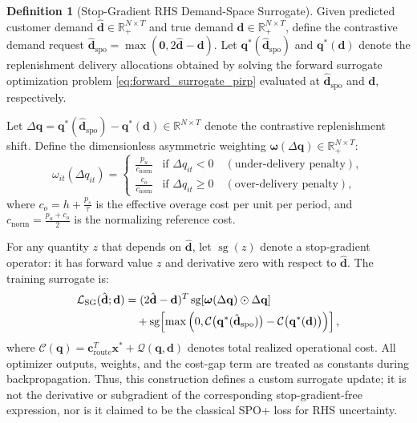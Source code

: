 \documentclass[11pt,a4paper]{article}
\theoremstyle{definition}
\newtheorem{definition}{Definition}
\theoremstyle{remark}
\begin{document}
\begin{definition}[Stop-Gradient RHS Demand-Space Surrogate]
\label{def:rhs_spop}
Given predicted customer demand $\hat{\mathbf{d}} \in \mathbb{R}_+^{N \times T}$ and true demand $\mathbf{d} \in \mathbb{R}_+^{N \times T}$, define the contrastive demand request $\hat{\mathbf{d}}_{\text{spo}} = \max(\mathbf{0}, 2\hat{\mathbf{d}} - \mathbf{d})$. Let $\mathbf{q}^*(\hat{\mathbf{d}}_{\text{spo}})$ and $\mathbf{q}^*(\mathbf{d})$ denote the replenishment delivery allocations obtained by solving the forward surrogate optimization problem \eqref{eq:forward_surrogate_pirp} evaluated at $\hat{\mathbf{d}}_{\text{spo}}$ and $\mathbf{d}$, respectively.

Let $\Delta \mathbf{q} = \mathbf{q}^*(\hat{\mathbf{d}}_{\text{spo}}) - \mathbf{q}^*(\mathbf{d}) \in \mathbb{R}^{N \times T}$ denote the contrastive replenishment shift. Define the dimensionless asymmetric weighting $\boldsymbol{\omega}(\Delta \mathbf{q}) \in \mathbb{R}_+^{N \times T}$:
\begin{equation}
    \omega_{it}(\Delta q_{it}) = \begin{cases} \displaystyle \frac{p_u}{c_{\text{norm}}} & \text{if } \Delta q_{it} < 0 \quad (\text{under-delivery penalty}), \\[8pt] \displaystyle \frac{c_o}{c_{\text{norm}}} & \text{if } \Delta q_{it} \ge 0 \quad (\text{over-delivery penalty}), \end{cases} \label{eq:asymmetric_weights}
\end{equation}
where $c_o = h + \frac{p_s}{\tau}$ is the effective overage cost per unit per period, and $c_{\text{norm}} = \frac{p_u + c_o}{2}$ is the normalizing reference cost. 

For any quantity $z$ that depends on $\hat{\mathbf{d}}$, let $\operatorname{sg}(z)$ denote a stop-gradient operator: it has forward value $z$ and derivative zero with respect to $\hat{\mathbf{d}}$. The training surrogate is:
\begin{align}
    \mathcal{L}_{\text{SG}}(\hat{\mathbf{d}}; \mathbf{d}) &= (2\hat{\mathbf{d}} - \mathbf{d})^T \operatorname{sg}\!\left[\boldsymbol{\omega}(\Delta \mathbf{q}) \odot \Delta \mathbf{q}\right] \notag \\
    &\quad + \operatorname{sg}\!\left[\max\left(0, \mathcal{C}\big(\mathbf{q}^*(\hat{\mathbf{d}}_{\text{spo}})\big) - \mathcal{C}\big(\mathbf{q}^*(\mathbf{d})\big)\right)\right], \label{eq:rhs_spop_loss}
\end{align}
where $\mathcal{C}(\mathbf{q}) = \mathbf{c}_{\text{route}}^T \mathbf{x}^* + \mathcal{Q}(\mathbf{q}, \mathbf{d})$ denotes total realized operational cost. All optimizer outputs, weights, and the cost-gap term are treated as constants during backpropagation. Thus, this construction defines a custom surrogate update; it is not the derivative or subgradient of the corresponding stop-gradient-free expression, nor is it claimed to be the classical SPO+ loss for RHS uncertainty.
\end{definition}
\end{document}
